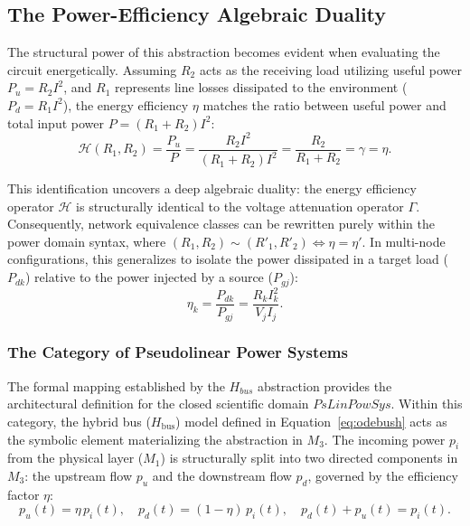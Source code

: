 \documentclass[energies,accept,oneauthor,pdftex]{Definitions/mdpi}
\begin{document}
\subsection{The Power-Efficiency Algebraic Duality}

The structural power of this abstraction becomes evident when evaluating the circuit energetically. Assuming $R_2$ acts as the receiving load utilizing useful power $P_u = R_2 I^2$, and $R_1$ represents line losses dissipated to the environment ($P_d = R_1 I^2$), the energy efficiency $\eta$ matches the ratio between useful power and total input power $P = (R_1 + R_2)I^2$:
\begin{equation}
    \mathcal{H}(R_1, R_2) = \frac{P_u}{P} = \frac{R_2 I^2}{(R_1 + R_2)I^2} = \frac{R_2}{R_1 + R_2} = \gamma = \eta.
\end{equation}

This identification uncovers a deep algebraic duality: the energy efficiency operator $\mathcal{H}$ is structurally identical to the voltage attenuation operator $\Gamma$. Consequently, network equivalence classes can be rewritten purely within the power domain syntax, where $(R_1, R_2) \sim (R'_1, R'_2) \iff \eta = \eta'$. In multi-node configurations, this generalizes to isolate the power dissipated in a target load ($P_{dk}$) relative to the power injected by a source ($P_{gj}$):
\begin{equation}
    \eta_k = \frac{P_{dk}}{P_{gj}} = \frac{R_k I_k^2}{V_j I_j}.
    \label{eq:resistive_network_rev}
\end{equation}

\subsubsection{The Category of Pseudolinear Power Systems}

The formal mapping established by the $H_{bus}$ abstraction provides the architectural definition for the closed scientific domain $\mathit{PsLinPowSys}$. Within this category, the hybrid bus ($H_{\text{bus}}$) model defined in Equation~\ref{eq:odebush} acts as the symbolic element materializing the abstraction in $M_3$. The incoming power $p_i$ from the physical layer ($M_1$) is structurally split into two directed components in $M_3$: the upstream flow $p_u$ and the downstream flow $p_d$, governed by the efficiency factor $\eta$:
\begin{equation}
	p_u(t) = \eta\, p_i(t), \quad  p_d(t) = (1-\eta)\, p_i(t), \quad  p_d(t) + p_u(t) = p_i(t).
	\label{eq:bus_parameters}
\end{equation}
\end{document}
